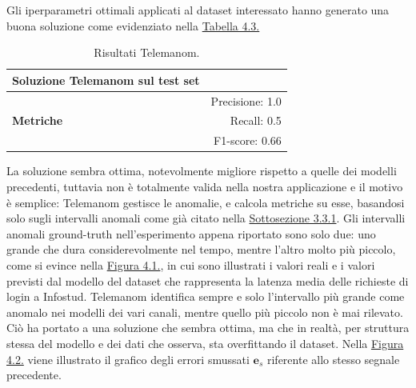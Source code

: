 
Gli iperparametri ottimali applicati al dataset interessato hanno generato una buona soluzione come evidenziato nella
    \hyperref[tab:telemanom-metrics]{Tabella 4.3.}

    \begin{table}[H]
        \centering
        \caption{Risultati Telemanom.}
        \begin{tabular}{lr}
        \toprule
        \textbf{Soluzione Telemanom sul test set}  \\
        \midrule
        \multirow{3}{*}{\textbf{Metriche}} 
            & Precisione: 1.0 \\
            & Recall: 0.5 \\
            & F1-score: 0.66 \\
        \bottomrule
        \end{tabular}
        \label{tab:telemanom-metrics}
    \end{table}

La soluzione sembra ottima, notevolmente migliore rispetto a quelle dei modelli precedenti, tuttavia non è totalmente 
valida nella nostra applicazione e il motivo è semplice: Telemanom gestisce le anomalie, e calcola metriche su esse,
basandosi solo sugli intervalli anomali come già citato nella \hyperref[sez-telemanom]{Sottosezione 3.3.1}. Gli intervalli anomali ground-truth
nell'esperimento appena riportato sono solo due: uno grande che dura considerevolmente nel tempo, mentre l'altro 
molto più piccolo, come si evince nella \hyperref[fig:telemanom-ys-comparison]{Figura 4.1.}, in cui 
sono illustrati i valori reali e i valori previsti dal modello del dataset che rappresenta la latenza media 
delle richieste di login a Infostud. Telemanom identifica sempre e solo l'intervallo più grande come anomalo 
nei modelli dei vari canali, mentre quello più piccolo non è mai rilevato. Ciò ha portato a una soluzione che
sembra ottima, ma che in realtà, per struttura stessa del modello e dei dati che osserva, sta overfittando il 
dataset. Nella \hyperref[fig:telemanom-e_s]{Figura 4.2.} viene illustrato il grafico degli errori
smussati $\mathbf{e}_s$ riferente allo stesso segnale precedente.

